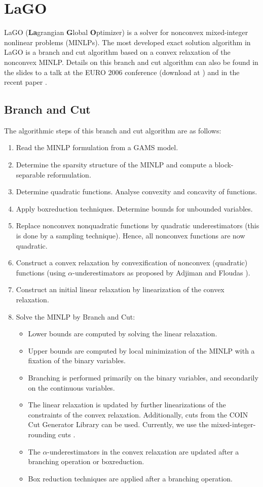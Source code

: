 \documentclass[11pt]{article}
\begin{document}
\section{LaGO}

LaGO ({\bf La}grangian {\bf G}lobal {\bf O}ptimizer) \cite{No05,lago} is a solver for nonconvex mixed-integer nonlinear problems (MINLPs).
The most developed exact solution algorithm in LaGO is a branch and cut algorithm based on a convex relaxation of the nonconvex MINLP.
Details on this branch and cut algorithm can also be found in the slides to a talk at the EURO 2006 conference (download at \cite{lago}) and in the recent paper \cite{NoVi06}.

\subsection{Branch and Cut}

The algorithmic steps of this branch and cut algorithm are as follows:
\begin{enumerate}
\item Read the MINLP formulation from a GAMS model.
\item Determine the sparsity structure of the MINLP and compute a block-separable reformulation.
\item Determine quadratic functions. Analyse convexity and concavity of functions.
\item Apply boxreduction techniques. Determine bounds for unbounded variables.
\item Replace nonconvex nonquadratic functions by quadratic underestimators (this is done by a sampling technique).
Hence, all nonconvex functions are now quadratic.
\item Construct a convex relaxation by convexification of nonconvex (quadratic) functions (using $\alpha$-underestimators as proposed by Adjiman and Floudas \cite{AdFl97}).
\item Construct an initial linear relaxation by linearization of the convex relaxation.
\item Solve the MINLP by Branch and Cut:
\begin{itemize}
\item Lower bounds are computed by solving the linear relaxation.
\item Upper bounds are computed by local minimization of the MINLP with a fixation of the binary variables.
\item Branching is performed primarily on the binary variables, and secondarily on the continuous variables.
\item The linear relaxation is updated by further linearizations of the constraints of the convex relaxation.
Additionally, cuts from the COIN Cut Generator Library can be used. Currently, we use the mixed-integer-rounding cuts \cite{GoLa05}.
\item The $\alpha$-underestimators in the convex relaxation are updated after a branching operation or boxreduction.
\item Box reduction techniques are applied after a branching operation.
\end{itemize}
\end{enumerate}
\end{document}
